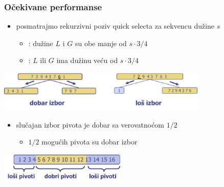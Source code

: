 \documentclass[compress]{beamer}
\begin{document}
\begin{frame}[fragile]
  \frametitle{Očekivane performanse}
  \begin{itemize}
    \item posmatrajmo rekurzivni poziv quick selecta za sekvencu dužine $s$
    \begin{itemize}
      \item {}: dužine $L$ i $G$ su obe manje od $s\cdot 3/4$
      \item {}: $L$ ili $G$ ima dužinu veću od $s\cdot 3/4$
    \end{itemize}
  \end{itemize}
  \begin{center}
    \includegraphics[width=10cm]{asp-12-pic38.png}
  \end{center}
  \begin{itemize}
    \item slučajan izbor pivota je dobar sa verovatnoćom $1/2$
    \begin{itemize}
      \item $1/2$ mogućih pivota su dobar izbor
    \end{itemize}
  \end{itemize}
  \begin{center}
    \includegraphics[width=6cm]{asp-12-pic39.png}
  \end{center}
\end{frame}
\end{document}
